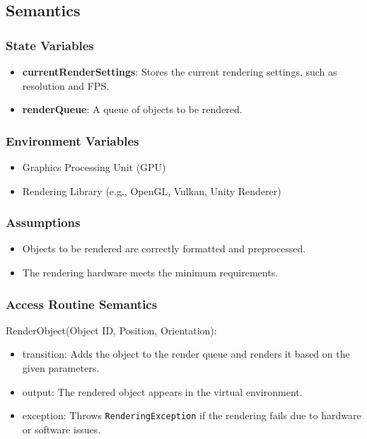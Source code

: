\documentclass[12pt, titlepage]{article}
\begin{document}
\subsection{Semantics}

\subsubsection{State Variables}

\begin{itemize}
  \item \textbf{currentRenderSettings}: Stores the current rendering settings, such as resolution and FPS.
  \item \textbf{renderQueue}: A queue of objects to be rendered.
\end{itemize}

\subsubsection{Environment Variables}

\begin{itemize}
  \item Graphics Processing Unit (GPU)
  \item Rendering Library (e.g., OpenGL, Vulkan, Unity Renderer)
\end{itemize}

\subsubsection{Assumptions}

\begin{itemize}
  \item Objects to be rendered are correctly formatted and preprocessed.
  \item The rendering hardware meets the minimum requirements.
\end{itemize}

\subsubsection{Access Routine Semantics}

\noindent RenderObject(Object ID, Position, Orientation):
\begin{itemize}
  \item transition: Adds the object to the render queue and renders it based on the given parameters.
  \item output: The rendered object appears in the virtual environment.
  \item exception: Throws \texttt{RenderingException} if the rendering fails due to hardware or software issues.
\end{itemize}
\end{document}
